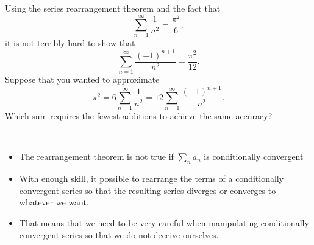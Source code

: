 \begin{example}
Using the series rearrangement theorem and the fact that
\begin{equation*}
\sum_{n=1}^\infty\frac{1}{n^2} = \frac{\pi^2}{6},
\end{equation*}
it is not terribly hard to show that
\begin{equation*}
\sum_{n=1}^\infty\frac{(-1)^{n+1}}{n^2} = \frac{\pi^2}{12}.
\end{equation*}
Suppose that you wanted to approximate 
\begin{equation*}
\pi^2 = 6 \sum_{n=1}^\infty\frac{1}{n^2} = 12\sum_{n=1}^\infty\frac{(-1)^{n+1}}{n^2}.
\end{equation*}
Which sum requires the fewest additions to achieve the same accuracy?
\end{example}
\ifdefined\SOLUTION
{}
\fi

\newpage

\begin{remark}\,
\begin{itemize}
\item The rearrangement theorem is not true if $\sum_n a_n$ is conditionally convergent
\item With enough skill, it possible to rearrange the terms of a conditionally convergent series so that the resulting series diverges or converges to whatever we want.
\item That means that we need to be very careful when manipulating conditionally convergent series so that we do not deceive ourselves.
\end{itemize}
\end{remark}

